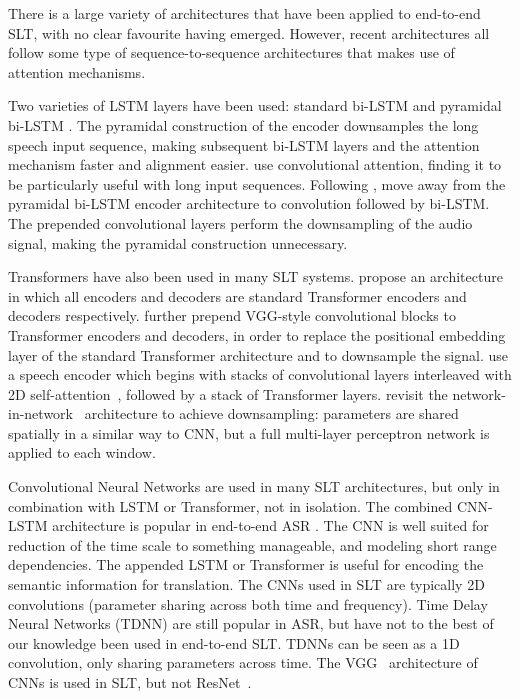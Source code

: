 \documentclass{svjour3}
\begin{document}
There is a large variety of architectures that have been applied to end-to-end SLT,
with no clear favourite having emerged.
However, recent architectures all follow some type of sequence-to-sequence architectures that makes use of attention mechanisms.

Two varieties of LSTM layers have been used:
standard bi-LSTM \citep[\emph{e.g.}][]{jia2019leveraging}
and pyramidal bi-LSTM \citep[\emph{e.g.}][]{duong-etal-2016-attentional,berard2016listen,bahar2019usingSpecAugment}.
The pyramidal construction of the encoder downsamples the long speech input sequence,
making subsequent bi-LSTM layers and the attention mechanism faster and alignment easier.
\citet{berard2016listen} use convolutional attention, finding it to be particularly useful with long input sequences.
Following \citet{weiss-s2s-st-2017}, \citet{berard-e2e-audiobooks-2018} move away from the pyramidal bi-LSTM encoder architecture to convolution followed by bi-LSTM.
The prepended convolutional layers perform the downsampling of the audio signal, making the pyramidal construction unnecessary.

Transformers have also been used in many SLT systems.
\citet{liu2019end} propose an architecture in which all encoders and decoders are standard Transformer encoders and decoders respectively.
\citet{pino2019harnessing} further prepend VGG-style convolutional blocks to Transformer encoders and decoders, in order to replace the positional embedding layer of the standard Transformer architecture and to downsample the signal.
\citet{gangi2019onetomany} use a speech encoder which begins with stacks of convolutional layers interleaved with 2D self-attention~\citep{dong2018speech},
followed by a stack of Transformer layers.
\citet{salesky2019fluent} revisit the network-in-network~\citep{lin2013network} architecture to achieve downsampling: parameters are shared spatially in a similar way to CNN, but a full multi-layer perceptron network is applied to each window. 


Convolutional Neural Networks are used in many SLT architectures,
but only in combination with LSTM or Transformer, not in isolation.
The combined CNN-LSTM architecture is popular in end-to-end ASR \citep{watanabe2018espnet}.
The CNN is well suited for reduction of the time scale to something manageable,
and modeling short range dependencies.
The appended LSTM or Transformer
is useful for encoding the semantic information for translation.
The CNNs used in SLT are typically 2D convolutions (parameter sharing across both time and frequency).
Time Delay Neural Networks (TDNN) are still popular in ASR, but have not to the best of our knowledge been used in end-to-end SLT. TDNNs can be seen as a 1D convolution, only sharing parameters across time.
The VGG~\citep{simonyan-vgg-2014} architecture of CNNs is used in SLT, but not ResNet~\citep{he-resnet-2016}.
\end{document}
